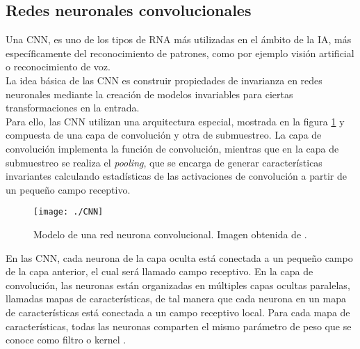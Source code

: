 \documentclass[a4paper, 12pt, spanish, chapterprefix, numbers=noenddot]{book}
\begin{document}
\subsection{Redes neuronales convolucionales}\label{CNN_section}

\begin{comment}
Uno de los tipos más populares de redes neuronales profundas son las conocidas como redes neuronales convolucionales (CNN). Las CNN eliminan la necesidad de una extracción de características manual, por lo que no es necesario identificar las características utilizadas para clasificar las imágenes. La CNN funciona mediante la extracción de características directamente de las imágenes. Las características relevantes no se entrenan previamente; se aprenden mientras la red se entrena con una colección de imágenes.\\
\end{comment}

Una CNN, es uno de los tipos de RNA más utilizadas en el ámbito de la IA, más específicamente del reconocimiento de patrones, como por ejemplo visión artificial o reconocimiento de voz.\\

La idea básica de las CNN es construir propiedades de invarianza en redes neuronales mediante la creación de modelos invariables para ciertas transformaciones en la entrada.\\

Para ello, las CNN utilizan una arquitectura especial, mostrada en la figura \ref{ModeloCNN} y compuesta de una capa de convolución y otra de submuestreo. La capa de convolución implementa la función de convolución, mientras que en la capa de submuestreo se realiza el \textit{pooling}, que se encarga de generar características invariantes calculando estadísticas de las activaciones de convolución a partir de un pequeño campo receptivo. 

\begin{figure}[H]
\begin{center}
\texttt{[image: ./CNN]}
\caption{Modelo de una red neurona convolucional. Imagen obtenida de \cite{CNN}.}
\label{ModeloCNN}
\end{center}
\end{figure}

En las CNN, cada neurona de la capa oculta está conectada a un pequeño campo de la capa anterior, el cual será llamado campo receptivo. En la capa de convolución, las neuronas están organizadas en múltiples capas ocultas paralelas, llamadas mapas de características,  de tal manera que cada neurona en un mapa de características está conectada a un campo receptivo local. Para cada mapa de características, todas las neuronas comparten el mismo parámetro de peso que se conoce como filtro o kernel \cite{CNN}.
\end{document}
